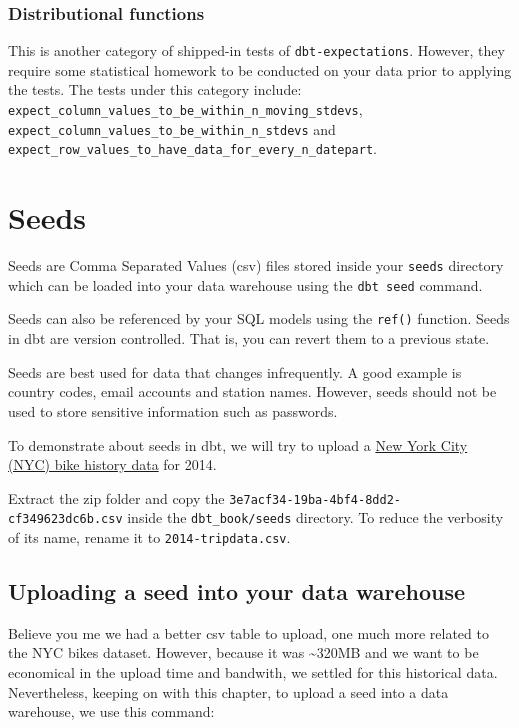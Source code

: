 \documentclass[
]{book}
\begin{document}
\hypertarget{distributional-functions}{%
\subsection{Distributional functions}\label{distributional-functions}}

This is another category of shipped-in tests of \texttt{dbt-expectations}. However, they require some statistical homework to be conducted on your data prior to applying the tests. The tests under this category include: \texttt{expect\_column\_values\_to\_be\_within\_n\_moving\_stdevs}, \texttt{expect\_column\_values\_to\_be\_within\_n\_stdevs} and \texttt{expect\_row\_values\_to\_have\_data\_for\_every\_n\_datepart}.

\hypertarget{seeds}{%
\chapter{Seeds}\label{seeds}}

Seeds are Comma Separated Values (csv) files stored inside your \texttt{seeds} directory which can be loaded into your data warehouse using the \texttt{dbt\ seed} command.

Seeds can also be referenced by your SQL models using the \texttt{ref()} function. Seeds in dbt are version controlled. That is, you can revert them to a previous state.

Seeds are best used for data that changes infrequently. A good example is country codes, email accounts and station names. However, seeds should not be used to store sensitive information such as passwords.

To demonstrate about seeds in dbt, we will try to upload a \href{https://www.civicdata.com/dataset/nyc-bike-share-trip-data/resource/3e7acf34-19ba-4bf4-8dd2-cf349623dc6b}{New York City (NYC) bike history data} for 2014.

Extract the zip folder and copy the \texttt{3e7acf34-19ba-4bf4-8dd2-cf349623dc6b.csv} inside the \texttt{dbt\_book/seeds} directory. To reduce the verbosity of its name, rename it to \texttt{2014-tripdata.csv}.

\hypertarget{uploading-a-seed-into-your-data-warehouse}{%
\section{Uploading a seed into your data warehouse}\label{uploading-a-seed-into-your-data-warehouse}}

Believe you me we had a better csv table to upload, one much more related to the NYC bikes dataset. However, because it was \textasciitilde320MB and we want to be economical in the upload time and bandwith, we settled for this historical data. Nevertheless, keeping on with this chapter, to upload a seed into a data warehouse, we use this command:
\end{document}
